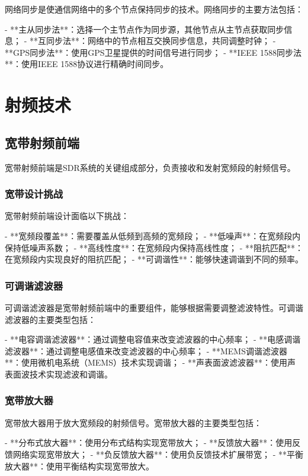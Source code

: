 ﻿\documentclass[UTF8]{ctexbook}
\begin{document}
网络同步是使通信网络中的多个节点保持同步的技术。网络同步的主要方法包括：

- **主从同步法**：选择一个主节点作为同步源，其他节点从主节点获取同步信息；
- **互同步法**：网络中的节点相互交换同步信息，共同调整时钟；
- **GPS同步法**：使用GPS卫星提供的时间信号进行同步；
- **IEEE 1588同步法**：使用IEEE 1588协议进行精确时间同步。
\section{射频技术}

\subsection{宽带射频前端}

宽带射频前端是SDR系统的关键组成部分，负责接收和发射宽频段的射频信号。

\subsubsection{宽带设计挑战}

宽带射频前端设计面临以下挑战：

- **宽频段覆盖**：需要覆盖从低频到高频的宽频段；
- **低噪声**：在宽频段内保持低噪声系数；
- **高线性度**：在宽频段内保持高线性度；
- **阻抗匹配**：在宽频段内实现良好的阻抗匹配；
- **可调谐性**：能够快速调谐到不同的频率。

\subsubsection{可调谐滤波器}

可调谐滤波器是宽带射频前端中的重要组件，能够根据需要调整滤波特性。可调谐滤波器的主要类型包括：

- **电容调谐滤波器**：通过调整电容值来改变滤波器的中心频率；
- **电感调谐滤波器**：通过调整电感值来改变滤波器的中心频率；
- **MEMS调谐滤波器**：使用微机电系统（MEMS）技术实现调谐；
- **声表面波滤波器**：使用声表面波技术实现滤波和调谐。

\subsubsection{宽带放大器}

宽带放大器用于放大宽频段的射频信号。宽带放大器的主要类型包括：

- **分布式放大器**：使用分布式结构实现宽带放大；
- **反馈放大器**：使用反馈网络实现宽带放大；
- **负反馈放大器**：使用负反馈技术扩展带宽；
- **平衡放大器**：使用平衡结构实现宽带放大。
\end{document}
